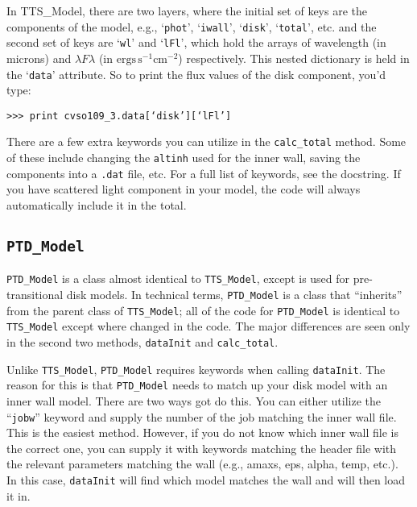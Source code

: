 \documentclass{article}
\begin{document}
In TTS\_Model, there are two layers, where the initial set of keys are the components of the model, e.g., `\texttt{phot}', `\texttt{iwall}', `\texttt{disk}', `\texttt{total}', etc. and the second set of keys are `\texttt{wl}' and `\texttt{lFl}’, which hold the arrays of wavelength (in microns) and $\lambda F\lambda $ (in $\mbox{ergs}\, \mbox{s}^{-1} \mbox{cm}^{-2}$) respectively. This nested dictionary is held in the ‘\texttt{data}’ attribute. So to print the flux values of the disk component, you’d type: 
 
\vspace{2mm}
\texttt{>>> print cvso109\_3.data[‘disk’][‘lFl’]}
\vspace{2mm}

There are a few extra keywords you can utilize in the \texttt{calc\_total} method. Some of these include changing the \texttt{altinh} used for the inner wall, saving the components into a \texttt{.dat} file, etc. For a full list of keywords, see the docstring. If you have scattered light component in your model, the code will always automatically include it in the total. 
 
\subsection{\texttt{PTD\_Model}}
 
\texttt{PTD\_Model} is a class almost identical to \texttt{TTS\_Model}, except is used for pre-transitional disk models. In technical terms, \texttt{PTD\_Model} is a class that “inherits” from the parent class of \texttt{TTS\_Model}; all of the code for \texttt{PTD\_Model} is identical to \texttt{TTS\_Model} except where changed in the code. The major differences are seen only in the second two methods, \texttt{dataInit} and \texttt{calc\_total}.
 
Unlike \texttt{TTS\_Model}, \texttt{PTD\_Model} requires keywords when calling \texttt{dataInit}. The reason for this is that \texttt{PTD\_Model} needs to match up your disk model with an inner wall model. There are two ways got do this. You can either utilize the “\texttt{jobw}” keyword and supply the number of the job matching the inner wall file. This is the easiest method. However, if you do not know which inner wall file is the correct one, you can supply it with keywords matching the header file with the relevant parameters matching the wall (e.g., amaxs, eps, alpha, temp, etc.). In this case, \texttt{dataInit} will find which model matches the wall and will then load it in. 
\end{document}
